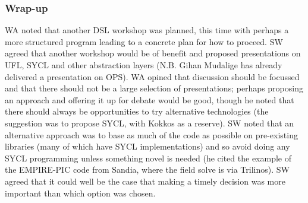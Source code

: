 \subsubsection{Wrap-up}\label{sec:wrap}
WA noted that another DSL workshop was planned, this time 
with perhaps a more structured program leading to a concrete plan for how to 
proceed.  SW agreed that another workshop would be of benefit and proposed 
presentations on UFL, SYCL and other abstraction layers (N.B. Gihan Mudalige 
has already delivered a presentation on OPS).  WA opined that discussion should 
be focussed and that there should not be a large selection of presentations; 
perhaps proposing an approach and offering it up for debate would be good, 
though he noted that there should always be opportunities to try alternative 
technologies (the suggestion was to propose SYCL, with Kokkos as a reserve).
SW noted that an alternative approach was to base as much of the code as 
possible on pre-existing libraries (many of which have SYCL implementations) 
and so avoid doing any SYCL programming unless something novel is needed (he 
cited the example of the EMPIRE-PIC code from Sandia, where the field solve is 
via Trilinos). 
SW agreed that it could well be the case that making a timely decision was
more important than which option was chosen.

